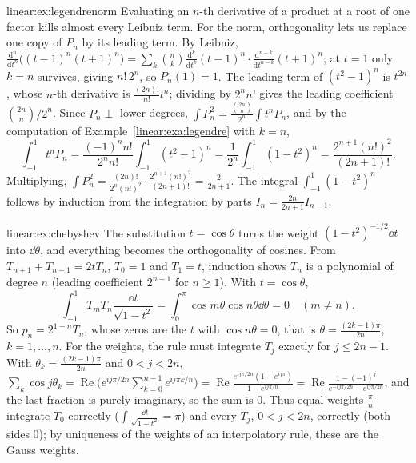 \begin{solution}{linear:ex:legendrenorm}
\idea Evaluating an $n$-th derivative of a product at a root of one factor kills almost every Leibniz term. For the
norm, orthogonality lets us replace one copy of $P_n$ by its leading term.
\writeup By Leibniz, $\frac{\mathrm d^n}{\mathrm dt^n}\bigl((t-1)^n(t+1)^n\bigr)=\sum_k\binom nk\frac{\mathrm d^k}{\mathrm
dt^k}(t-1)^n\cdot\frac{\mathrm d^{n-k}}{\mathrm dt^{n-k}}(t+1)^n$; at $t=1$ only $k=n$ survives, giving $n!\,2^n$, so
$P_n(1)=1$. The leading term of $(t^2-1)^n$ is $t^{2n}$, whose $n$-th derivative is $\frac{(2n)!}{n!}t^n$; dividing by
$2^nn!$ gives the leading coefficient $\binom{2n}n/2^n$. Since $P_n\perp$ lower degrees, $\int P_n^2=\frac{\binom{2n}n}{2^n}
\int t^nP_n$, and by the computation of Example~\ref{linear:exa:legendre} with $k=n$,
\[
\int_{-1}^1t^nP_n=\frac{(-1)^nn!}{2^nn!}\int_{-1}^1(t^2-1)^n=\frac1{2^n}\int_{-1}^1(1-t^2)^n=\frac{2^{n+1}(n!)^2}{(2n+1)!}.
\]
Multiplying, $\int P_n^2=\frac{(2n)!}{2^n(n!)^2}\cdot\frac{2^{n+1}(n!)^2}{(2n+1)!}=\frac2{2n+1}$. The integral $\int_{-1}^1(1-t^2)^n$
follows by induction from the integration by parts $I_n=\frac{2n}{2n+1}I_{n-1}$.
\end{solution}

\begin{solution}{linear:ex:chebyshev}
\idea The substitution $t=\cos\theta$ turns the weight $(1-t^2)^{-1/2}\dd t$ into $\dd\theta$, and everything becomes
the orthogonality of cosines.
\writeup From $T_{n+1}+T_{n-1}=2tT_n$, $T_0=1$ and $T_1=t$, induction shows $T_n$ is a polynomial of degree $n$
(leading coefficient $2^{n-1}$ for $n\ge1$). With $t=\cos\theta$,
\[
\int_{-1}^1T_mT_n\frac{\dd t}{\sqrt{1-t^2}}=\int_0^\pi\cos m\theta\cos n\theta\dd\theta=0\quad(m\ne n).
\]
So $p_n=2^{1-n}T_n$, whose zeros are the $t$ with $\cos n\theta=0$, that is $\theta=\frac{(2k-1)\pi}{2n}$, $k=1,\dots,n$.
For the weights, the rule must integrate $T_j$ exactly for $j\le2n-1$. With $\theta_k=\frac{(2k-1)\pi}{2n}$ and $0<j<2n$,
$\sum_k\cos j\theta_k=\operatorname{Re}\bigl(e^{ij\pi/2n}\sum_{k=0}^{n-1}e^{ij\pi k/n}\bigr)=\operatorname{Re}\frac{e^{ij\pi/2n}
(1-e^{ij\pi})}{1-e^{ij\pi/n}}=\operatorname{Re}\frac{1-(-1)^j}{e^{-ij\pi/2n}-e^{ij\pi/2n}}$, and the last fraction is purely
imaginary, so the sum is $0$. Thus equal weights $\frac\pi n$ integrate $T_0$ correctly ($\int\frac{\dd t}{\sqrt{1-t^2}}=\pi$)
and every $T_j$, $0<j<2n$, correctly (both sides $0$); by uniqueness of the weights of an interpolatory rule, these are the
Gauss weights.
\end{solution}

